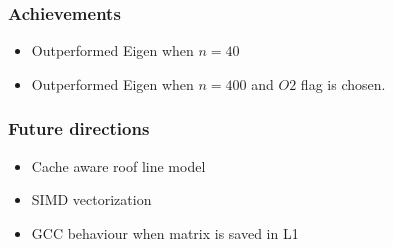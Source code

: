 \documentclass{beamer}
\begin{document}
\begin{frame}
\frametitle{Achievements}
\begin{itemize}
 \item<1-> Outperformed Eigen when $n = 40$
 \item<2-> Outperformed Eigen when $n = 400$ and $O2$ flag is chosen.  
\end{itemize}
 \end{frame}
 
\begin{frame}
\frametitle{Future directions}

\begin{itemize}
 \item<1-> Cache aware roof line model
 \item<2-> SIMD vectorization
 \item<3-> GCC behaviour when matrix is saved in L1
\end{itemize}
\end{frame}
\end{document}
